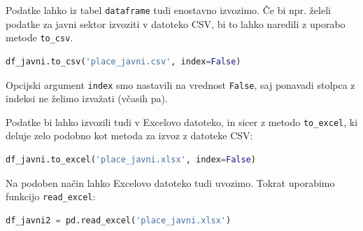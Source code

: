 Podatke lahko iz tabel \texttt{dataframe} tudi enostavno izvozimo. Če bi npr. želeli podatke za javni sektor izvoziti v datoteko CSV, bi to lahko naredili z uporabo metode \texttt{to\_csv}.
\begin{lstlisting}[language=python]
df_javni.to_csv('place_javni.csv', index=False)
\end{lstlisting}
Opcijski argument \texttt{index} smo nastavili na vrednost \texttt{False}, saj ponavadi stolpca z indeksi ne želimo izvažati (včasih pa). 

Podatke bi lahko izvozili tudi v Excelovo datoteko, in sicer z metodo \texttt{to\_excel}, ki deluje zelo podobno kot metoda za izvoz z datoteke CSV:
\begin{lstlisting}[language=python]
df_javni.to_excel('place_javni.xlsx', index=False)
\end{lstlisting}
Na podoben način lahko Excelovo datoteko tudi uvozimo. Tokrat uporabimo funkcijo \texttt{read\_excel}:
\begin{lstlisting}[language=python]
df_javni2 = pd.read_excel('place_javni.xlsx')
\end{lstlisting}
